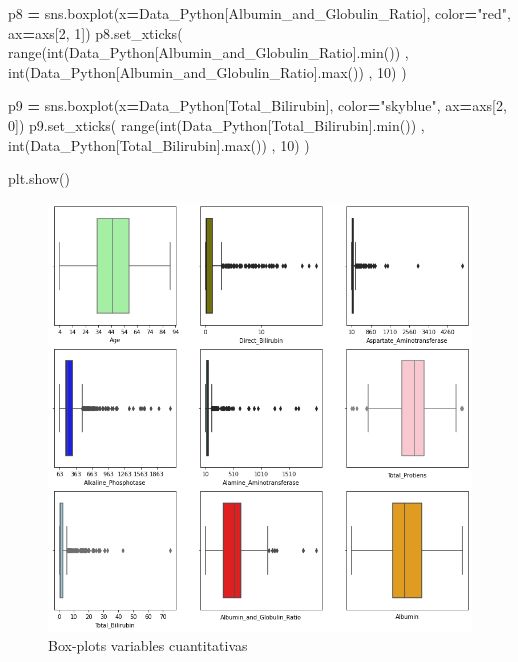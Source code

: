 \documentclass[
  11pt,
  a4paper,
]{article}
\newenvironment{Shaded}{\begin{snugshade}}{\end{snugshade}}
\newcommand{\BuiltInTok}[1]{#1}
\newcommand{\DecValTok}[1]{\textcolor[rgb]{0.00,0.00,0.81}{#1}}
\newcommand{\NormalTok}[1]{#1}
\newcommand{\OperatorTok}[1]{\textcolor[rgb]{0.81,0.36,0.00}{\textbf{#1}}}
\newcommand{\StringTok}[1]{\textcolor[rgb]{0.31,0.60,0.02}{#1}}
\begin{document}
\begin{Shaded}
\begin{Highlighting}[]
\NormalTok{p8 }\OperatorTok{=}\NormalTok{ sns.boxplot(x}\OperatorTok{=}\NormalTok{Data\_Python[}\StringTok{\textquotesingle{}Albumin\_and\_Globulin\_Ratio\textquotesingle{}}\NormalTok{], color}\OperatorTok{=}\StringTok{"red"}\NormalTok{, ax}\OperatorTok{=}\NormalTok{axs[}\DecValTok{2}\NormalTok{, }\DecValTok{1}\NormalTok{])}
\NormalTok{p8.set\_xticks( }\BuiltInTok{range}\NormalTok{(}\BuiltInTok{int}\NormalTok{(Data\_Python[}\StringTok{\textquotesingle{}Albumin\_and\_Globulin\_Ratio\textquotesingle{}}\NormalTok{].}\BuiltInTok{min}\NormalTok{()) , }\BuiltInTok{int}\NormalTok{(Data\_Python[}\StringTok{\textquotesingle{}Albumin\_and\_Globulin\_Ratio\textquotesingle{}}\NormalTok{].}\BuiltInTok{max}\NormalTok{()) , }\DecValTok{10}\NormalTok{) )}

\NormalTok{p9 }\OperatorTok{=}\NormalTok{ sns.boxplot(x}\OperatorTok{=}\NormalTok{Data\_Python[}\StringTok{\textquotesingle{}Total\_Bilirubin\textquotesingle{}}\NormalTok{], color}\OperatorTok{=}\StringTok{"skyblue"}\NormalTok{, ax}\OperatorTok{=}\NormalTok{axs[}\DecValTok{2}\NormalTok{, }\DecValTok{0}\NormalTok{])}
\NormalTok{p9.set\_xticks( }\BuiltInTok{range}\NormalTok{(}\BuiltInTok{int}\NormalTok{(Data\_Python[}\StringTok{\textquotesingle{}Total\_Bilirubin\textquotesingle{}}\NormalTok{].}\BuiltInTok{min}\NormalTok{()) , }\BuiltInTok{int}\NormalTok{(Data\_Python[}\StringTok{\textquotesingle{}Total\_Bilirubin\textquotesingle{}}\NormalTok{].}\BuiltInTok{max}\NormalTok{()) , }\DecValTok{10}\NormalTok{) )}


\NormalTok{plt.show()}
\end{Highlighting}
\end{Shaded}

\begin{figure}
\centering
\includegraphics{output_140_0.png}
\caption{Box-plots variables cuantitativas}
\end{figure}
\end{document}

